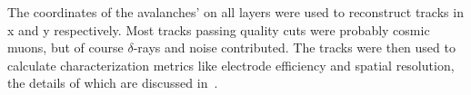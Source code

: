 The coordinates of the avalanches' on all layers were used to reconstruct tracks in x and y respectively. Most tracks passing quality cuts were probably cosmic muons, but of course $\delta$-rays and noise contributed. The tracks were then used to calculate characterization metrics like electrode efficiency and spatial resolution, the details of which are discussed in~\cite{lefebvre_thesis}.

